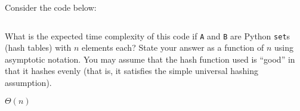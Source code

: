 \begin{prob}
    Consider the code below:

    \inputminted{python}{./code.py}

    What is the expected time complexity of this code if \texttt{A} and
    \texttt{B} are Python \texttt{set}s (hash tables) with $n$ elements each?
    State your answer as a function of $n$ using asymptotic notation.
    You may assume that the hash function used is ``good'' in that it hashes
    evenly (that is, it satisfies the simple universal hashing assumption).

    \begin{soln}
        $\Theta(n)$
    \end{soln}

\end{prob}
